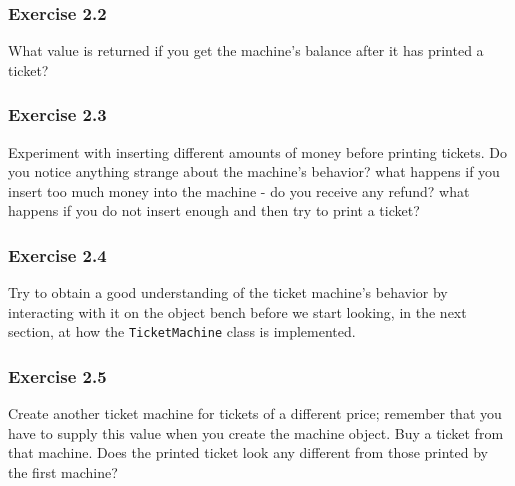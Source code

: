 \subsubsection{Exercise 2.2}
What value is returned if you get the machine's balance after it has printed a 
ticket? 

\subsubsection{Exercise 2.3}
Experiment with inserting different amounts of money before printing tickets. 
Do you notice anything strange about the machine's behavior? what happens if 
you insert too much money into the machine - do you receive any refund? what 
happens if you do not insert enough and then try to print a ticket? 

\subsubsection{Exercise 2.4}
Try to obtain a good understanding of the ticket machine's behavior by 
interacting with it on the object bench before we start looking, in the next 
section, at how the \verb?TicketMachine? class is implemented. 

\subsubsection{Exercise 2.5}
Create another ticket machine for tickets of a different price; remember that 
you have to supply this value when you create the machine object. Buy a ticket 
from that machine. Does the printed ticket look any different from those 
printed by the first machine? 

